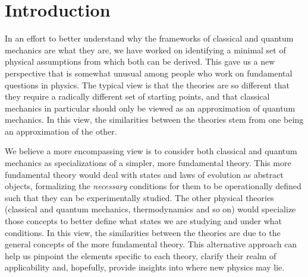 \documentclass[applsci,article,submit,moreauthors,pdftex]{Definitions/mdpi}
\begin{document}

\section{Introduction}

In an effort to better understand why the frameworks of classical and quantum mechanics are what they are, we have worked on identifying a minimal set of physical assumptions from which both can be derived.\cite{Carc1} This gave us a new perspective that is somewhat unusual among people who work on fundamental questions in physics. The typical view is that the theories are so different that they require a radically different set of starting points, and that classical mechanics in particular should only be viewed as an approximation of quantum mechanics. In this view, the similarities between the theories stem from one being an approximation of the other.

We believe a more encompassing view is to consider both classical and quantum mechanics as specializations of a simpler, more fundamental theory. This more fundamental theory would deal with states and laws of evolution as abstract objects, formalizing the \emph{necessary} conditions for them to be operationally defined such that they can be experimentally studied. The other physical theories (classical and quantum mechanics, thermodynamics and so on) would specialize those concepts to better define what states we are studying and under what conditions. In this view, the similarities between the theories are due to the general concepts of the more fundamental theory. This alternative approach can help us pinpoint the elements specific to each theory, clarify their realm of applicability and, hopefully, provide insights into where new physics may lie.
\end{document}
